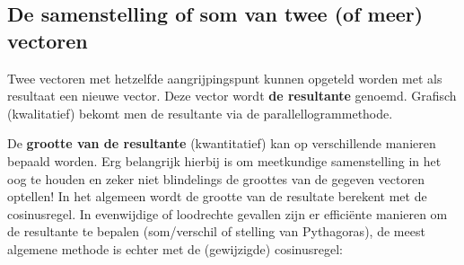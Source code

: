 \documentclass{ximera}
\begin{document}
\subsection*{De samenstelling of som van twee (of meer) vectoren}

Twee vectoren met hetzelfde aangrijpingspunt kunnen opgeteld worden met als resultaat een nieuwe vector. 
Deze vector wordt \textbf{de resultante} genoemd. 
Grafisch (kwalitatief) bekomt men de resultante via de parallellogrammethode.  %

\begin{image}[0.2\textwidth]
\end{image}


De \textbf{grootte van de resultante} (kwantitatief) kan op verschillende manieren bepaald worden. 
Erg belangrijk hierbij is om meetkundige samenstelling in het oog te houden en zeker niet blindelings de groottes van de gegeven vectoren optellen! 
In het algemeen wordt de grootte van de resultate berekent met de cosinusregel. 
In evenwijdige of loodrechte gevallen zijn er efficiënte manieren om de resultante te bepalen (som/verschil of stelling van Pythagoras), de meest algemene methode is echter met de (gewijzigde) cosinusregel:
\end{document}
